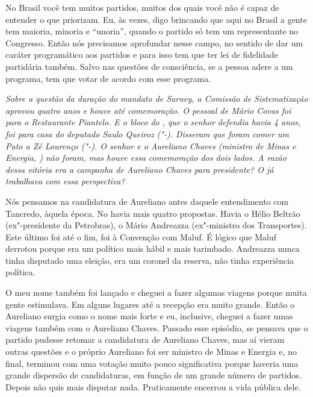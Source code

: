 No Brasil você tem muitos partidos, muitos dos quais você não é capaz de
entender o que priorizam. Eu, às vezes, digo brincando que aqui no
Brasil a gente tem maioria, minoria e ``unoria'', quando o partido só
tem um representante no Congresso. Então nós precisamos aprofundar nesse
campo, no sentido de dar um caráter programático aos partidos e para
isso tem que ter lei de fidelidade partidária também. Salvo nas questões
de consciência, se a pessoa adere a um programa, tem que votar de acordo
com esse programa.

\medskip

\noindent\emph{Sobre a questão da duração do mandato de Sarney, a Comissão de
Sistematização aprovou quatro anos e houve até comemoração. O pessoal de
Mário Covas foi para o Restaurante Piantelo. E o bloco do , que o
senhor defendia havia 4 anos, foi para casa do deputado Saulo Queiroz
("-). Disseram que foram comer um Pato a Zé Lourenço
("-). O senhor e o Aureliano Chaves (ministro de Minas e Energia,
) não foram, mas houve essa comemoração dos dois lados. A razão dessa
vitória era a campanha de Aureliano Chaves para presidente? O  já
trabalhava com essa perspectiva?}

Nós pensamos na candidatura de Aureliano antes daquele
entendimento com Tancredo, àquela época. No  havia mais quatro
propostas. Havia o Hélio Beltrão (ex"-presidente da Petrobras), o Mário
Andreazza (ex"-ministro dos Transportes). Este último foi até o fim, foi
à Convenção com Maluf. É lógico que Maluf derrotou porque era um
político mais hábil e mais tarimbado. Andreazza nunca tinha disputado
uma eleição, era um coronel da reserva, não tinha experiência política.

O meu nome também foi lançado e cheguei a fazer algumas viagens porque
muita gente estimulava. Em alguns lugares até a recepção era muito
grande. Então o Aureliano surgia como o nome mais forte e eu,
inclusive, cheguei a fazer umas viagens também com o Aureliano Chaves.
Passado esse episódio, se pensava que o partido pudesse retomar a
candidatura de Aureliano Chaves, mas aí vieram outras questões e o
próprio Aureliano foi ser ministro de Minas e Energia e, no final,
terminou com uma votação muito pouco significativa porque haveria uma
grande dispersão de candidaturas, em função de um grande número de
partidos. Depois não quis mais disputar nada. Praticamente encerrou a
vida pública dele.

\medskip

